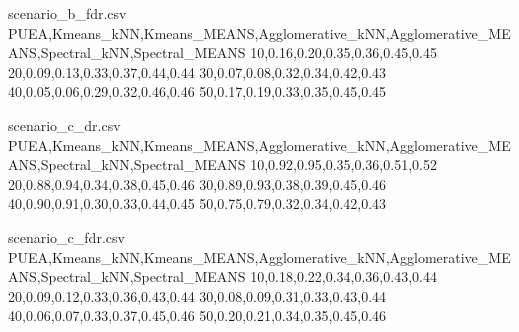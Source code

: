 \begin{filecontents*}{scenario_b_fdr.csv}
PUEA,Kmeans_kNN,Kmeans_MEANS,Agglomerative_kNN,Agglomerative_MEANS,Spectral_kNN,Spectral_MEANS
10,0.16,0.20,0.35,0.36,0.45,0.45
20,0.09,0.13,0.33,0.37,0.44,0.44
30,0.07,0.08,0.32,0.34,0.42,0.43
40,0.05,0.06,0.29,0.32,0.46,0.46
50,0.17,0.19,0.33,0.35,0.45,0.45
\end{filecontents*}

\begin{filecontents*}{scenario_c_dr.csv}
PUEA,Kmeans_kNN,Kmeans_MEANS,Agglomerative_kNN,Agglomerative_MEANS,Spectral_kNN,Spectral_MEANS
10,0.92,0.95,0.35,0.36,0.51,0.52
20,0.88,0.94,0.34,0.38,0.45,0.46
30,0.89,0.93,0.38,0.39,0.45,0.46
40,0.90,0.91,0.30,0.33,0.44,0.45
50,0.75,0.79,0.32,0.34,0.42,0.43
\end{filecontents*}

\begin{filecontents*}{scenario_c_fdr.csv}
PUEA,Kmeans_kNN,Kmeans_MEANS,Agglomerative_kNN,Agglomerative_MEANS,Spectral_kNN,Spectral_MEANS
10,0.18,0.22,0.34,0.36,0.43,0.44
20,0.09,0.12,0.33,0.36,0.43,0.44
30,0.08,0.09,0.31,0.33,0.43,0.44
40,0.06,0.07,0.33,0.37,0.45,0.46
50,0.20,0.21,0.34,0.35,0.45,0.46
\end{filecontents*}



